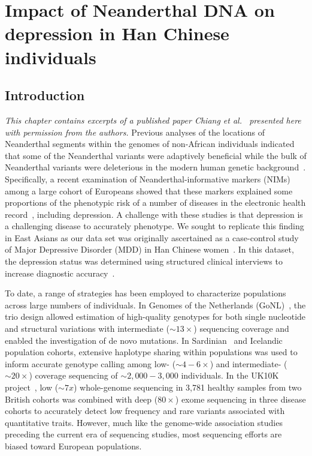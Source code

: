\chapter{Impact of Neanderthal DNA on depression in Han Chinese individuals}
\section{Introduction} 
\textit{This chapter contains excerpts of a published paper Chiang et al.~\cite{chiang2018comprehensive} presented here with permission from the authors.
}
Previous analyses of the locations of Neanderthal segments within the genomes of non-African individuals indicated that some of the Neanderthal variants were adaptively beneficial while the bulk of Neanderthal variants were deleterious in the modern human genetic background~\cite{harris2016genetic,juric2016strength}. Specifically, a recent examination of Neanderthal-informative markers (NIMs) among a large cohort of Europeans showed that these markers explained some proportions of the phenotypic risk of a number of diseases in the electronic health record~\cite{simonti2016phenotypic}, including depression. A challenge with these studies is that depression is a challenging disease to accurately phenotype. We sought to replicate this finding in East Asians as our data set was originally ascertained as a case-control study of Major Depressive Disorder (MDD) in Han Chinese women~\cite{cai2015sparse}. In this dataset, the depression status was determined using structured clinical interviews to increase diagnostic accuracy~\cite{cai201711}. 

To date, a range of strategies has been employed to characterize populations across large numbers of individuals. In Genomes of the Netherlands (GoNL)~\cite{gonl}, the trio design allowed estimation of high-quality genotypes for both single nucleotide and structural variations with intermediate ($\sim13\times$) sequencing coverage and enabled the investigation of de novo mutations. In Sardinian~\cite{sidore2015genome} and Icelandic~\cite{gudbjartsson2015large} population cohorts, extensive haplotype sharing within populations was used to inform accurate genotype calling among low- ($\sim4 - 6\times$) and intermediate- ($\sim20\times$) coverage sequencing of $\sim2,000 - 3,000$ individuals. In the UK10K project~\cite{walter526management}, low ($\sim 7x $) whole-genome sequencing in 3,781 healthy samples from two British cohorts was combined with deep ($80\times$) exome sequencing in three disease cohorts to accurately detect low frequency and rare variants associated with quantitative traits. However, much like the genome-wide association studies preceding the current era of sequencing studies, most sequencing efforts are biased toward European populations. 


